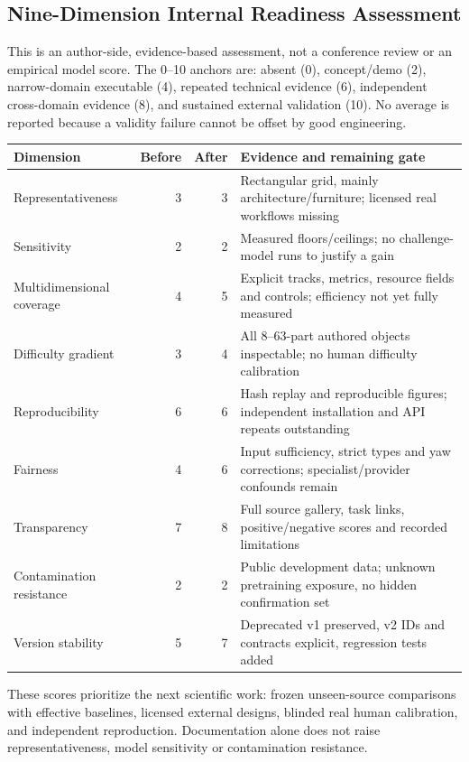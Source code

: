 \subsection{Nine-Dimension Internal Readiness Assessment}
This is an author-side, evidence-based assessment, not a conference review or an
empirical model score. The 0--10 anchors are: absent (0), concept/demo (2),
narrow-domain executable (4), repeated technical evidence (6), independent
cross-domain evidence (8), and sustained external validation (10). No average is
reported because a validity failure cannot be offset by good engineering.
\begin{tabularx}{\textwidth}{@{}lrrX@{}}
\toprule Dimension & Before & After & Evidence and remaining gate\\
\midrule
Representativeness & 3 & 3 & Rectangular grid, mainly architecture/furniture; licensed real workflows missing\\
Sensitivity & 2 & 2 & Measured floors/ceilings; no challenge-model runs to justify a gain\\
Multidimensional coverage & 4 & 5 & Explicit tracks, metrics, resource fields and controls; efficiency not yet fully measured\\
Difficulty gradient & 3 & 4 & All 8--63-part authored objects inspectable; no human difficulty calibration\\
Reproducibility & 6 & 6 & Hash replay and reproducible figures; independent installation and API repeats outstanding\\
Fairness & 4 & 6 & Input sufficiency, strict types and yaw corrections; specialist/provider confounds remain\\
Transparency & 7 & 8 & Full source gallery, task links, positive/negative scores and recorded limitations\\
Contamination resistance & 2 & 2 & Public development data; unknown pretraining exposure, no hidden confirmation set\\
Version stability & 5 & 7 & Deprecated v1 preserved, v2 IDs and contracts explicit, regression tests added\\
\bottomrule
\end{tabularx}
These scores prioritize the next scientific work: frozen unseen-source comparisons
with effective baselines, licensed external designs, blinded real human calibration,
and independent reproduction. Documentation alone does not raise representativeness,
model sensitivity or contamination resistance.
